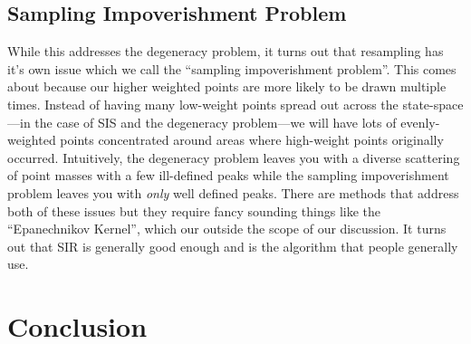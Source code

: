 \documentclass{article}
\begin{document}
\subsection{Sampling Impoverishment Problem}
While this addresses the degeneracy problem, it turns out that resampling has it's own issue which we call the ``sampling impoverishment problem''. This comes about because our higher weighted points are more likely to be drawn multiple times. Instead of having many low-weight points spread out across the state-space---in the case of SIS and the degeneracy problem---we will have lots of evenly-weighted points concentrated around areas where high-weight points originally occurred. Intuitively, the degeneracy problem leaves you with a diverse scattering of point masses with a few ill-defined peaks while the sampling impoverishment problem leaves you with \textit{only} well defined peaks. There are methods that address both of these issues but they require fancy sounding things like the ``Epanechnikov Kernel'', which our outside the scope of our discussion. It turns out that SIR is generally good enough and is the algorithm that people generally use.

\FloatBarrier
\section{Conclusion}







\end{document}
